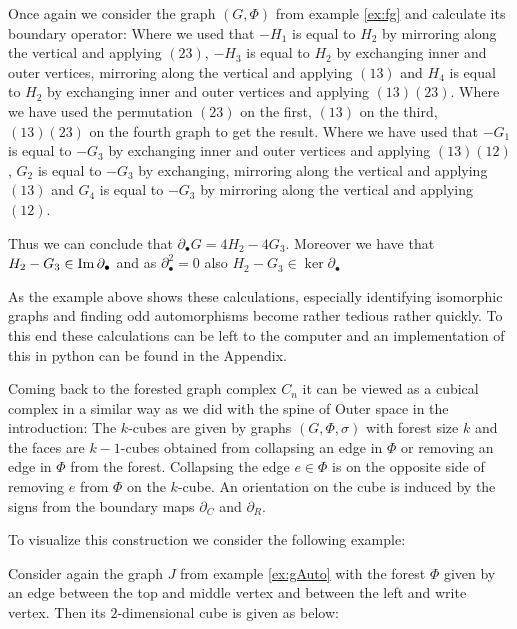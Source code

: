 \begin{eg}
	Once again we consider the graph $(G,\Phi)$ from example \ref{ex:fg} and calculate its boundary operator:
	Where we used that $-H_{1}$ is equal to $H_{2}$ by mirroring along the vertical and applying $(2 3)$,
	$-H_{3}$ is equal to $H_2$ by exchanging inner and outer vertices, mirroring along the vertical and applying $(1 3)$ and
	$H_{4}$ is equal to $H_{2}$ by exchanging inner and outer vertices and applying $(1 3)(2 3)$.
	Where we have used the permutation $(2 3)$ on the first,  $(1 3)$ on the third, $(1 3)(2 3)$ on the fourth graph to get the result.
	Where we have used that $-G_{1}$ is equal to $-G_{3}$ by exchanging inner and outer vertices and applying $(1 3)(1 2)$,
	$G_{2}$ is equal to $-G_{3}$ by exchanging, mirroring along the vertical and applying $(1 3)$ and
	$G_{4}$ is equal to $-G_{3}$ by mirroring along the vertical and applying $(1 2)$. 

	Thus we can conclude that $\partial_{\bullet} G = 4 H_2 - 4 G_3$. Moreover we have that $H_2 - G_3 \in \operatorname{Im} \partial_{\bullet}$ and 
	as $\partial_{\bullet}^2=0$ also $H_2 - G_3 \in \ker \partial_{\bullet}$
\end{eg}

\begin{remark}
As the example above shows these calculations, especially identifying isomorphic graphs and finding odd automorphisms 
become rather tedious rather quickly. To this end these calculations can be left to the computer and an implementation
of this in python can be found in the Appendix.
\end{remark}

Coming back to the forested graph complex $C_{n}$ it can be viewed as a cubical complex in a similar way as we did with the spine of Outer space in the introduction:
The $k$-cubes are given by graphs $(G,\Phi,\sigma)$
with forest size $k$ and the faces are $k-1$-cubes obtained from collapsing an edge in $\Phi$ 
or removing an edge in $\Phi$ from the forest. Collapsing the edge $e \in \Phi$ is
on the opposite side of removing $e$ from $\Phi$ on the $k$-cube.
An orientation on the cube is induced by the signs from the boundary maps $\partial_{C}$ and $\partial_{R}$.

To visualize this construction we consider the following example:
\begin{eg}
	Consider again the graph $J$ from example \ref{ex:gAuto} with the forest $\Phi$ given by an edge between the top and middle vertex and
	between the left and write vertex.
	Then its $2$-dimensional cube is given as below:
\end{eg}
\newpage
